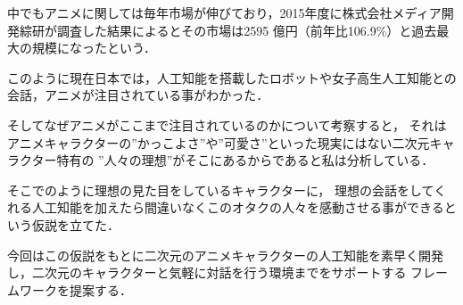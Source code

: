 中でもアニメに関しては毎年市場が伸びており，2015年度に株式会社メディア開発綜研が調査した結果によるとその市場は2595
億円（前年比106.9\%）と過去最大の規模になったという．\cite{anime}

このように現在日本では，人工知能を搭載したロボットや女子高生人工知能との会話，アニメが注目されている事がわかった．

そしてなぜアニメがここまで注目されているのかについて考察すると，
それはアニメキャラクターの”かっこよさ”や”可愛さ”といった現実にはない二次元キャラクター特有の
”人々の理想”がそこにあるからであると私は分析している．


そこでのように理想の見た目をしているキャラクターに，
理想の会話をしてくれる人工知能を加えたら間違いなくこのオタクの人々を感動させる事ができるという仮説を立てた．

今回はこの仮説をもとに二次元のアニメキャラクターの人工知能を素早く開発し，二次元のキャラクターと気軽に対話を行う環境までをサポートする
フレームワークを提案する．

